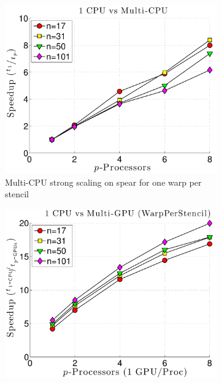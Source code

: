 \begin{figure}[htbp]
\centering
\begin{subfigure}[b]{0.425\textwidth}
\centering
\includegraphics[width=1.0\textwidth]{../figures/spear_results/vortex/speedup_1CPU_vs_NCPU-eps-converted-to.pdf}
\caption{Multi-CPU strong scaling on spear for one warp per stencil}
\label{fig:alltoall_multicpu_scaling}
\end{subfigure} 
\begin{subfigure}[b]{0.425\textwidth}
\centering
\includegraphics[width=1.0\textwidth]{../figures/spear_results/vortex/speedup_1CPU_vs_NGPU_WarpPerStencil-eps-converted-to.pdf}

\end{subfigure}
\end{figure}
